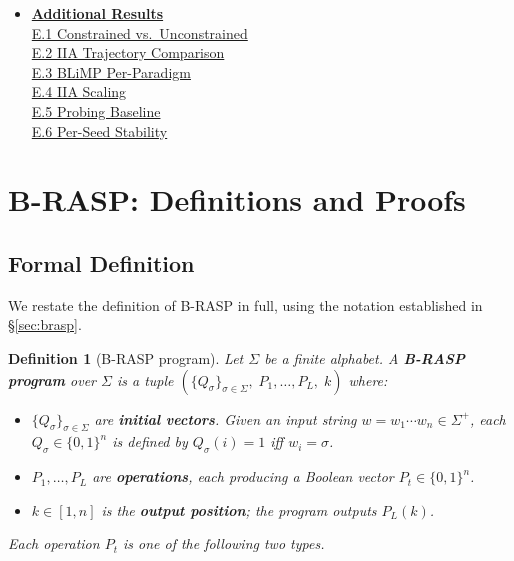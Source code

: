 \documentclass[11pt]{article}
\newtheorem{definition}{Definition}
\begin{document}
{\begin{itemize}[itemsep=4pt,topsep=2pt,leftmargin=*]
  \hyperref[app:alt-scm]{D.4 Alt-SCM Controls}\\
  \hyperref[app:sae-size]{D.5 SAE Size}\\
  \hyperref[app:negative]{D.6 Negative Controls}\\
  \hyperref[app:succinctness-all]{D.7 Cross-Phenomenon Succinctness}
\item[\textbf{E}] \hyperref[app:additional]{\textbf{Additional Results}}\\[1pt]
  \hyperref[app:sutter]{E.1 Constrained vs.\ Unconstrained}\\
  \hyperref[app:trajectory-comparison]{E.2 IIA Trajectory Comparison}\\
  \hyperref[app:blimp-results]{E.3 BLiMP Per-Paradigm}\\
  \hyperref[app:scaling]{E.4 IIA Scaling}\\
  \hyperref[app:probing]{E.5 Probing Baseline}\\
  \hyperref[app:per-seed]{E.6 Per-Seed Stability}
\end{itemize}
}
\vspace{6pt}

\section{B-RASP: Definitions and Proofs}
\label{app:brasp}

\subsection{Formal Definition}
\label{app:brasp-def}

We restate the definition of B-RASP \citep{DBLP:conf/nips/Yang0A24} in full, using the notation established in \S\ref{sec:brasp}.

\begin{definition}[B-RASP program]
\label{def:brasp}
Let $\Sigma$ be a finite alphabet.
A \textbf{B-RASP program} over $\Sigma$ is a tuple $(\{Q_\sigma\}_{\sigma \in \Sigma},\; P_1, \ldots, P_L,\; k)$ where:
\begin{itemize}[itemsep=2pt,leftmargin=*]
    \item $\{Q_\sigma\}_{\sigma \in \Sigma}$ are \textbf{initial vectors}. Given an input string $w = w_1 \cdots w_n \in \Sigma^+$, each $Q_\sigma \in \{0,1\}^n$ is defined by $Q_\sigma(i) = 1$ iff $w_i = \sigma$.
    \item $P_1, \ldots, P_L$ are \textbf{operations}, each producing a Boolean vector $P_t \in \{0,1\}^n$.
    \item $k \in [1, n]$ is the \textbf{output position}; the program outputs $P_L(k)$.
\end{itemize}
Each operation $P_t$ is one of the following two types.
\end{definition}
\end{document}
